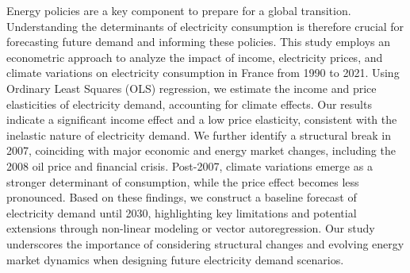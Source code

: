 Energy policies are a key component to prepare for a global transition. Understanding the determinants of electricity consumption is therefore crucial for forecasting future demand and informing these policies. This study employs an econometric approach to analyze the impact of income, electricity prices, and climate variations on electricity consumption in France from 1990 to 2021. Using Ordinary Least Squares (OLS) regression, we estimate the income and price elasticities of electricity demand, accounting for climate effects. Our results indicate a significant income effect and a low price elasticity, consistent with the inelastic nature of electricity demand. We further identify a structural break in 2007, coinciding with major economic and energy market changes, including the 2008 oil price and financial crisis. Post-2007, climate variations emerge as a stronger determinant of consumption, while the price effect becomes less pronounced. Based on these findings, we construct a baseline forecast of electricity demand until 2030, highlighting key limitations and potential extensions through non-linear modeling or vector autoregression. Our study underscores the importance of considering structural changes and evolving energy market dynamics when designing future electricity demand scenarios.
